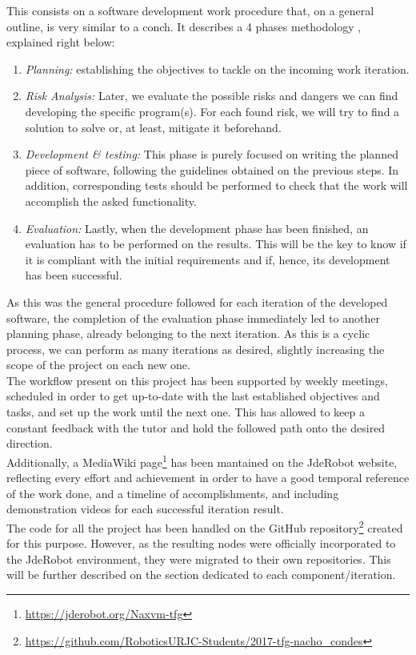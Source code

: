 This consists on a software development work procedure that, on a general outline, is very similar to a conch. It describes a 4 phases methodology \cite{spiral-steps}, explained right below:

\begin{enumerate}
	\item \textit{Planning:} establishing the objectives to tackle on the incoming work iteration.

	\item \textit{Risk Analysis:} Later, we evaluate the possible risks and dangers we can find developing the specific program(s). For each found risk, we will try to find a solution to solve or, at least, mitigate it beforehand.

	\item \textit{Development \& testing:} This phase is purely focused on writing the planned piece of software, following the guidelines obtained on the previous steps. In addition, corresponding tests should be performed to check that the work will accomplish the asked functionality.
	\item \textit{Evaluation:} Lastly, when the development phase has been finished, an evaluation has to be performed on the results. This will be the key to know if it is compliant with the initial requirements and if, hence, its development has been successful.
\end{enumerate}

As this was the general procedure followed for each iteration of the developed software, the completion of the evaluation phase immediately led to another planning phase, already belonging to the next iteration. As this is a cyclic process, we can perform as many iterations as desired, slightly increasing the scope of the project on each new one.\\

The workflow present on this project has been supported by weekly meetings, scheduled in order to get up-to-date with the last established objectives and tasks, and set up the work until the next one. This has allowed to keep a constant feedback with the tutor and hold the followed path onto the desired direction.\\

Additionally, a MediaWiki page\footnote{\url{https://jderobot.org/Naxvm-tfg}} has been mantained on the JdeRobot website, reflecting every effort and achievement in order to have a good temporal reference of the work done, and a timeline of accomplishments, and including demonstration videos for each successful iteration result.\\

The code for all the project has been handled on the GitHub repository\footnote{\url{https://github.com/RoboticsURJC-Students/2017-tfg-nacho\_condes}} created for this purpose. However, as the resulting nodes were officially incorporated to the JdeRobot environment, they were migrated to their own repositories. This will be further described on the section dedicated to each component/iteration.\\
